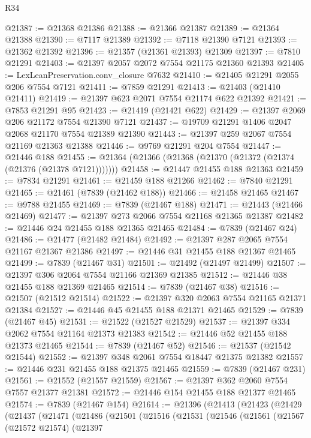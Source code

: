 \begin{lexlean}{R34}
\begin{coremodule}
@21387 := @21368 @21386
@21388 := @21366 @21387
@21389 := @21364 @21388
@21390 := @7117 @21389
@21392 := @7118 @21390 @7121
@21393 := @21362 @21392
@21396 := @21357 (@21361 @21393) @21309
@21397 := @7810 @21291
@21403 := @21397 @2057 @2072 @7554 @21175 @21360 @21393
@21405 := LexLeanPreservation.conv_closure @7632
@21410 := @21405 @21291 @2055 @206 @7554 @7121
@21411 := @7859 @21291
@21413 := @21403 (@21410 @21411)
@21419 := @21397 @623 @2071 @7554 @21174 @622 @21392
@21421 := @7853 @21291 @95
@21423 := @21419 (@21421 @622)
@21429 := @21397 @2069 @206 @21172 @7554 @21390 @7121
@21437 := @19709 @21291 @1406 @2047 @2068 @21170 @7554 @21389 @21390
@21443 := @21397 @259 @2067 @7554 @21169 @21363 @21388
@21446 := @9769 @21291 @204 @7554
@21447 := @21446 @188
@21455 := @21364 (@21366 (@21368 (@21370 (@21372 (@21374 (@21376 (@21378 @7121)))))))
@21458 := @21447 @21455 @188 @21363
@21459 := @7834 @21291
@21461 := @21459 @188 @21266
@21462 := @7840 @21291
@21465 := @21461 (@7839 (@21462 @188))
@21466 := @21458 @21465
@21467 := @9788 @21455
@21469 := @7839 (@21467 @188)
@21471 := @21443 (@21466 @21469)
@21477 := @21397 @273 @2066 @7554 @21168 @21365 @21387
@21482 := @21446 @24 @21455 @188 @21365 @21465
@21484 := @7839 (@21467 @24)
@21486 := @21477 (@21482 @21484)
@21492 := @21397 @287 @2065 @7554 @21167 @21367 @21386
@21497 := @21446 @31 @21455 @188 @21367 @21465
@21499 := @7839 (@21467 @31)
@21501 := @21492 (@21497 @21499)
@21507 := @21397 @306 @2064 @7554 @21166 @21369 @21385
@21512 := @21446 @38 @21455 @188 @21369 @21465
@21514 := @7839 (@21467 @38)
@21516 := @21507 (@21512 @21514)
@21522 := @21397 @320 @2063 @7554 @21165 @21371 @21384
@21527 := @21446 @45 @21455 @188 @21371 @21465
@21529 := @7839 (@21467 @45)
@21531 := @21522 (@21527 @21529)
@21537 := @21397 @334 @2062 @7554 @21164 @21373 @21383
@21542 := @21446 @52 @21455 @188 @21373 @21465
@21544 := @7839 (@21467 @52)
@21546 := @21537 (@21542 @21544)
@21552 := @21397 @348 @2061 @7554 @18447 @21375 @21382
@21557 := @21446 @231 @21455 @188 @21375 @21465
@21559 := @7839 (@21467 @231)
@21561 := @21552 (@21557 @21559)
@21567 := @21397 @362 @2060 @7554 @7557 @21377 @21381
@21572 := @21446 @154 @21455 @188 @21377 @21465
@21574 := @7839 (@21467 @154)
@21614 := @21396
    (@21413
      (@21423
        (@21429
          (@21437
            (@21471
              (@21486
                (@21501
                  (@21516
                    (@21531
                      (@21546
                        (@21561
                          (@21567
                            (@21572 @21574)
                            (@21397

\end{coremodule}
\end{lexlean}
